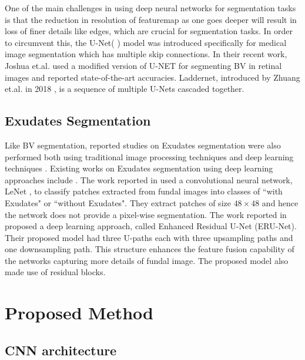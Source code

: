 \documentclass[utf8]{FrontiersinHarvard} %
\begin{document}
One of the main challenges in using deep neural networks for segmentation tasks is that the reduction in resolution of featuremap as one goes deeper will result in loss of finer details like edges, which are crucial for segmentation tasks. In order to circumvent this, the U-Net( \cite{ronneberger2015u}) model was introduced specifically for medical image segmentation which has multiple skip connections. In their recent work, Joshua et.al. \cite{joshua2020blood} used a modified version of U-NET for segmenting BV in retinal images and reported state-of-the-art accuracies. Laddernet, introduced by Zhuang et.al. in 2018 \cite{zhuang2018laddernet},  is a sequence of multiple U-Nets cascaded together.

\subsection{Exudates Segmentation}
Like BV segmentation, reported studies on Exudates segmentation  were also performed both using traditional image processing techniques \cite{}  and deep learning techniques . Existing works on Exudates segmentation using deep learning approaches include \cite{perdomo2017convolutional,tan2017automated, feng2017deep, zheng2018detection}. The work reported in \cite{perdomo2017convolutional,kou2020enhanced} used a convolutional neural network,  LeNet \cite{lecun1989handwritten}, to classify patches extracted from fundal images into classes of ``with Exudates" or ``without Exudates". They extract patches of size $48\times48$ and hence the network does not provide a pixel-wise segmentation.  The work reported in \cite{kou2020enhanced} proposed a deep learning approach, called Enhanced Residual U-Net (ERU-Net). Their proposed model had three U-paths each with three upsampling paths and one downsampling path. This structure enhances the feature fusion capability of the networks capturing more details of fundal image. The proposed model also made use of residual blocks.


\section{Proposed Method}
\subsection{CNN architecture}
\end{document}
